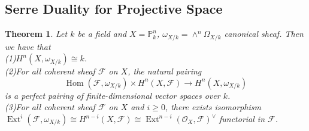 \documentclass{ctexart}
\newtheorem{theorem}{Theorem}[section]
\renewcommand{\hom}{\operatorname{Hom}}
\newcommand{\ext}{\operatorname{Ext}}
\begin{document}
\subsection{Serre Duality for Projective Space}
\label{subsection:Serre Duality for Projective Space}
\begin{theorem}
    Let $k$ be a field and $X = \mathbb{P}_{k}^{n}$, $\omega_{X/k} = \wedge^{n} \Omega_{X/k}$ canonical sheaf.
    Then we have that \\
    (1)$H^{n}(X, \omega_{X/k}) \cong k$. \\
    (2)For all coherent sheaf $\mathcal{F}$ on $X$, the natural pairing 
    \begin{equation*}
        \hom(\mathcal{F}, \omega_{X/k}) \times H^{n}(X, \mathcal{F}) \longrightarrow H^{n}(X, \omega_{X/k})
    \end{equation*}
    is a perfect pairing of finite-dimensional vector spaces over $k$. \\
    (3)For all coherent sheaf $\mathcal{F}$ on $X$ and $i \ge 0$, there exists isomorphism $\ext^{i}(\mathcal{F}, \omega_{X/k}) \cong H^{n - i}(X, \mathcal{F}) \cong \ext^{n - i}(\mathcal{O}_{X}, \mathcal{F})^{\lor}$ functorial in $\mathcal{F}$.
    \label{Theorem 11.2}
\end{theorem}
\end{document}
